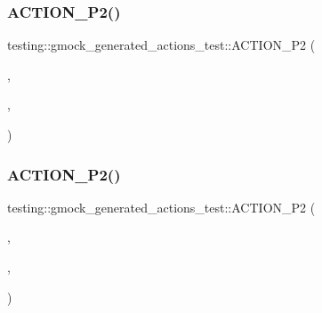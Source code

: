 \subsubsection{\texorpdfstring{ACTION\_P2()}{ACTION\_P2()}\hspace{0.1cm}{\footnotesize\ttfamily [3/4]}}
{\footnotesize\ttfamily testing\+::gmock\+\_\+generated\+\_\+actions\+\_\+test\+::\+A\+C\+T\+I\+O\+N\+\_\+\+P2 (\begin{DoxyParamCaption}\item[{Do\+Foo}]{,  }\item[{p0}]{,  }\item[{p1}]{ }\end{DoxyParamCaption})}

\mbox{\label{namespacetesting_1_1gmock__generated__actions__test_a0e2768c0fae30bc46ec6e322b29dd54c}} 
\subsubsection{\texorpdfstring{ACTION\_P2()}{ACTION\_P2()}\hspace{0.1cm}{\footnotesize\ttfamily [4/4]}}
{\footnotesize\ttfamily testing\+::gmock\+\_\+generated\+\_\+actions\+\_\+test\+::\+A\+C\+T\+I\+O\+N\+\_\+\+P2 (\begin{DoxyParamCaption}\item[{Plus2}]{,  }\item[{\mbox{\hyperlink{_obj__test_2lib_2googletest-master_2googlemock_2test_2gmock-matchers__test_8cc_a6150e0515f7202e2fb518f7206ed97dc}{x}}}]{,  }\item[{\mbox{\hyperlink{_obj__test_2lib_2googletest-master_2googlemock_2test_2gmock-matchers__test_8cc_a39cb44155237f0205e0feb931d5acbed}{y}}}]{ }\end{DoxyParamCaption})}

\mbox{\label{namespacetesting_1_1gmock__generated__actions__test_a35c62beac532eaff7e54b8ad4a7fe1cf}} 
